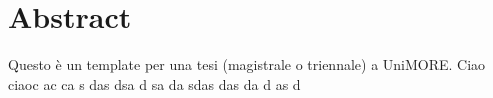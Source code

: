 \thispagestyle{plain}
\section*{Abstract}
Questo è un template per una tesi (magistrale o triennale) a UniMORE. Ciao ciaoc ac ca s das dsa d sa da sdas das da d as d 
\newpage